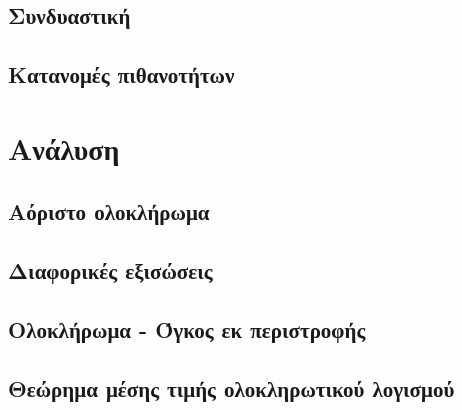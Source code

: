 \documentclass[twoside,11pt,a4paper]{book}
\begin{document}
\section{Συνδυαστική}
\section{Κατανομές πιθανοτήτων}
\chapter{Ανάλυση}
\section{Αόριστο ολοκλήρωμα}
\section{Διαφορικές εξισώσεις}
\section{Ολοκλήρωμα - Όγκος εκ περιστροφής}
\section{Θεώρημα μέσης τιμής ολοκληρωτικού λογισμού}
\end{document}
